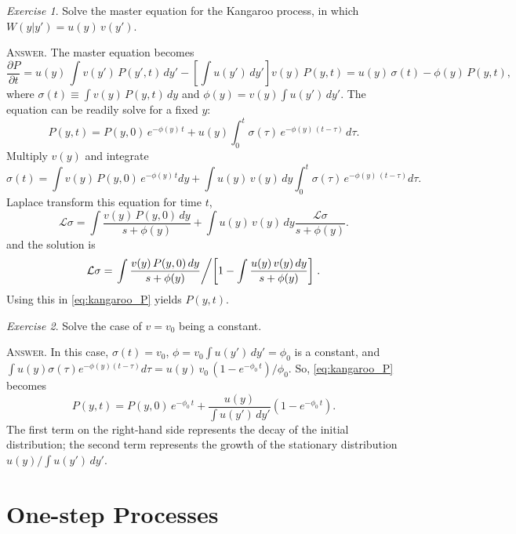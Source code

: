 \documentclass{book}
\numberwithin{equation}{section}
\theoremstyle{plain}
\theoremstyle{definition}
\theoremstyle{remark}
\newtheorem{exercise}{Exercise}
\newcommand{\answer}[1]{{\color{DarkBlue}\footnotesize \textsc{Answer.} #1}}
\begin{document}
\begin{exercise}
  Solve the master equation for the Kangaroo process,
  in which $W(y|y') = u(y) \, v(y')$.

  \answer{
  The master equation becomes
  $$
  \frac{ \partial P } { \partial t }
  =
  u(y) \, \int v(y') \, P(y', t) \, dy'
  -
  \left[\int u(y') \, dy' \right]
  v(y) \, P(y, t)
  =
  u(y) \, \sigma(t) - \phi(y) \, P(y, t),
  $$
  where $\sigma(t) \equiv \int v(y) \, P(y, t) \, dy$
  and
  $\phi(y) = v(y) \int u(y') \, dy'$.
  The equation can be readily solve for a fixed $y$:
  \begin{equation}
  P(y, t)
  =
  P(y, 0) \, e^{-\phi(y) \, t}
  +
  u(y) \int_0^t \sigma(\tau) \, e^{-\phi(y) \, (t - \tau)} \, d\tau.
  \label{eq:kangaroo_P}
  \end{equation}
  Multiply $v(y)$ and integrate
  $$
  \sigma(t) = \int v(y) \, P(y, 0) \, e^{-\phi(y) \, t} dy
  +
  \int u(y) \, v(y) \, dy
  \int_0^t \sigma(\tau) \, e^{-\phi(y) \, (t - \tau) } d\tau.
  $$
  Laplace transform this equation for time $t$,
  $$
  \mathcal L\sigma
  =
  \int \frac{ v(y) \, P(y, 0) \, dy } { s + \phi(y) }
  +
  \int u(y) \, v(y) \, dy \frac{ \mathcal L\sigma }{ s + \phi(y) }.
  $$
  and the solution is
  $$
  \mathcal L\sigma
  =
  \left. \int \frac{ v(y) \, P(y, 0) \, dy } { s + \phi(y) }
  \middle/
  \left[
    1 - \int \frac{ u(y) \, v(y) \, dy }{ s + \phi(y) }
  \right]
  \right..
  $$
  Using this in \eqref{eq:kangaroo_P} yields $P(y, t)$.
  }
\end{exercise}

\begin{exercise}
  Solve the case of $v = v_0$ being a constant.

  \answer{
  In this case, $\sigma(t) = v_0$,
  $\phi = v_0 \int u(y') \, dy' = \phi_0$
  is a constant,
  and
  $
  \int u(y) \sigma(\tau) e^{-\phi(y) (t - \tau)} d\tau
  = u(y) \, v_0 \, (1 - e^{-\phi_0 \, t}) / \phi_0.
  $
  So, \eqref{eq:kangaroo_P} becomes
  $$
  P(y, t)
  =
  P(y, 0) \, e^{-\phi_0 \, t}
  +
  \frac{ u(y) } { \int u(y') \, dy' }
  \left(
    1 - e^{-\phi_0 \, t}
  \right).
  $$
  The first term on the right-hand side represents
  the decay of the initial distribution;
  the second term represents the growth of the stationary distribution
  $u(y) / \int u(y') \, dy'$.
  }
\end{exercise}



\chapter{One-step Processes}
\end{document}
